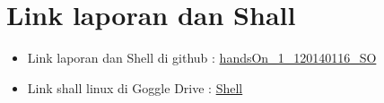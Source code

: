 \documentclass[11pt,a4paper]{article}
\begin{document}
\section{Link laporan dan Shall}
\begin{itemize}
	\item Link laporan dan Shell di github : \href{https://github.com/masQ-21dev/handsOn_1_120140116_SO.git}{handsOn\_1\_120140116\_SO}
	\item Link shall linux di Goggle Drive : \href{https://drive.google.com/drive/folders/108PHgy26UJxgDnNY7fMCPOvoM_1Gnk_O?usp=sharing}{Shell}
\end{itemize}
\end{document}
